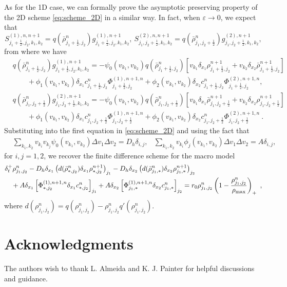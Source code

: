 \documentclass[review,onefignum,onetabnum]{siamart220329}
\begin{document}
As for the 1D case, we can formally prove the asymptotic preserving property of the 2D scheme \cref{eq:scheme_2D} in a similar way. 
In fact, when $\varepsilon\to 0$, we expect that  
\begin{equation*}
	S_{j_1+\frac12, j_2, k_1, k_2}^{(1), n, n+1} = q( {\bar{\rho}}_{j_1+\frac12,j_2}^n) g_{j_1+\frac12,j_2,k_1,k_2}^{(1), n+1}, \  S_{j_1, j_2+\frac12, k_1, k_2}^{(2), n, n+1} = q( {\bar{\rho}}_{j_1,j_2+\frac12}^n) g_{j_1,j_2+\frac12,k_1,k_2}^{(2), n+1},
\end{equation*}
from where we have
\begin{align*}
  & q( {\bar{\rho}}_{j_1+\frac12,j_2}^n) g_{j_1+\frac12,j_2,k_1,k_2}^{(1), n+1} = -\psi_{0}(v_{k_1}, v_{k_2})q( \bar{\rho}_{j_1+\frac12,j_2}^n)  \left[v_{k_1} \delta_{x_1} \rho_{j_1+\frac12, j_2}^{n+1} + v_{k_2} \delta_{x_2} \bar{\rho}_{j_1+\frac12, j_2}^{n+1} \right] \nonumber \\
        & \qquad  + \phi_{1}(v_{k_1}, v_{k_2})\delta_{x_1} c_{j_1+\frac12,j_2}^n \Phi^{(1),n+1,n}_{j_1+\frac12,j_2}+\phi_{2}(v_{k_1}, v_{k_2}) \delta_{x_2} c_{j_1+\frac12,j_2}^n
        \Phi^{(2),n+1,n}_{j_1+\frac12,j_2},\\
	&q( \bar{\rho}_{j_1,j_2+\frac12}^n) g_{j_1,j_2+\frac12,k_1,k_2}^{(2), n+1} = -\psi_{0}(v_{k_1}, v_{k_2})q( \bar{\rho}_{j_1,j_2+\frac12}^n)  \left[v_{k_1} \delta_{x_1} \bar{\rho}_{j_1, j_2+\frac12}^{n+1} + v_{k_2} \delta_{x_2} \rho_{j_1, j_2+\frac12}^{n+1} \right] \nonumber\\
    & \qquad  + \phi_{1}(v_{k_1}, v_{k_2})\delta_{x_1} c_{j_1,j_2+\frac12}^n\Phi^{(1),n+1,n}_{j_1,j_2+\frac12} +\phi_{2}(v_{k_1}, v_{k_2}) \delta_{x_2} c_{j_1,j_2+\frac12}^n 
    \Phi^{(2),n+1,n}_{j_1,j_2+\frac12}\ .
\end{align*}
Substituting into the first equation in \cref{eq:scheme_2D} and using the fact that
\begin{align*}
	&\sum_{k_1,k_2} v_{k_i}v_{k_j} \psi_0(v_{k_1},v_{k_2}) \Delta v_1 \Delta v_2 = D_h \delta_{i,j},  
	&\sum_{k_1,k_2} v_{k_i} \phi_j(v_{k_1},v_{k_2}) \Delta v_1 \Delta v_2 = A\delta_{i,j},                   
\end{align*}
for $i,j = 1,2$, 
we recover the finite difference scheme for the macro model 
\begin{align*}
	&\delta_t^+ \rho_{j_1,j_2}^n   
    	- D_h \delta_{x_1} \left( d(\bar{\rho}_{*,j_2}^n) \delta_{x_1} \rho_{*,j_2}^{n+1}\right)_{j_1} 
	- D_h \delta_{x_2} \left( d(\bar{\rho}_{j_1,*}^n)\delta_{x_2} \rho_{j_1, *}^{n+1} \right)_{j_2} 	\nonumber \\
	 & \quad + A\delta_{x_1}\left[\Phi_{*,j_2}^{(1),n+1,n}\delta_{x_1} c_{*,j_2}^n\right]_{j_1} 
	 + A\delta_{x_2}\left[\Phi_{j_1,*}^{(1),n+1,n}\delta_{x_2} c_{j_1,*}^n\right]_{j_2}
    = r_0 \rho_{j_1,j_2}^{n}\left(1 - \frac{\rho_{j_1,j_2}^n}{\rho_{\rm max}}\right)_+\ ,
\end{align*}
where $d(\rho_{j_1,j_2}^n) = q(\rho_{j_1,j_2}^n) - \rho_{j_1,j_2}^n q'( \rho_{j_1,j_2}^n)$.

\section*{Acknowledgments}
The authors wish to thank L. Almeida and K. J. Painter for helpful discussions and guidance.



\end{document}
